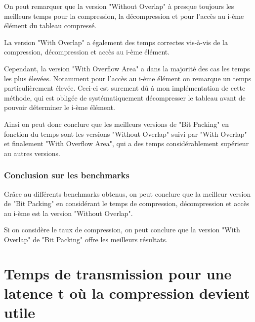 \documentclass[titlepage]{article}
\begin{document}
On peut remarquer que la version "Without Overlap" à presque toujours les meilleurs temps pour la compression, la décompression et pour l'accès au i-ème élément du tableau compressé.
\par La version "With Overlap" a également des temps correctes vis-à-vis de la compression, décompression et accès au i-ème élément.
\par Cependant, la version "With Overflow Area" a dans la majorité des cas les temps les plus élevées. Notamment pour l'accès au i-ème élément on remarque un temps particulièrement élevée. Ceci-ci est surement dû à mon implémentation de cette méthode, qui est obligée de systématiquement décompresser le tableau avant de pouvoir déterminer le i-ème élément. 
\par Ainsi on peut donc conclure que les meilleurs versions de "Bit Packing" en fonction du temps sont les versions "Without Overlap" suivi par "With Overlap" et finalement "With Overflow Area", qui a des temps considérablement supérieur au autres versions. 

\subsubsection{Conclusion sur les benchmarks}

Grâce au différents benchmarks obtenus, on peut conclure que la meilleur version de "Bit Packing" en considérant le temps de compression, décompression et accès au i-ème est la version "Without Overlap".
\par Si on considère le taux de compression, on peut conclure que la version "With Overlap" de "Bit Packing" offre les meilleurs résultats. 

\clearpage



\section{Temps de transmission pour une latence t où la compression devient utile}



\clearpage
\end{document}
